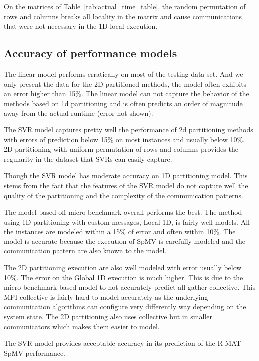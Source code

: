 \documentclass[sigconf,review,anonymous]{acmart}
\begin{document}
On the matrices of Table~\ref{tab:actual_time_table}, the random
permutation of rows and columns breaks all locality in the matrix and
cause communications that were not necessary in the 1D local
execution.

\subsection{Accuracy of performance models}

The linear model performs erratically on most of the testing data
set. And we only present the data for the 2D partitioned methods, the
model often exhibits an error higher than 15\%. The linear model can
not capture the behavior of the methods based on 1d partitioning and
is often predicts an order of magnitude away from the actual runtime
(error not shown).

The SVR model captures pretty well the performance of 2d partitioning
methods with errors of prediction below 15\% on most instances and
usually below 10\%. 2D partitioning with uniform permutation of rows
and columns provides the regularity in the dataset that SVRs can
easily capture.

Though the SVR model has moderate accuracy on 1D partitioning
model. This stems from the fact that the features of the SVR model do
not capture well the quality of the partitioning and the complexity of
the communication patterns.

The model based off micro benchmark overall performs the best. The
method using 1D partitioning with custom messages, Local 1D, is fairly
well models. All the instances are modeled within a 15\% of error and
often within 10\%. The model is accurate because the execution of SpMV
is carefully modeled and the communication pattern are also known to
the model.

The 2D partitioning execution are also well modeled with error usually
below 10\%. The error on the Global 1D execution is much higher. This
is due to the micro benchmark based model to not accurately predict
all gather collective. This MPI collective is fairly hard to model
accurately as the underlying communication algorithms can configure 
very differently way depending on the system state. The
2D partitioning also uses collective but in smaller communicators
which makes them easier to model.

The SVR model provides acceptable accuracy in its prediction of the
R-MAT SpMV performance.

\end{document}
